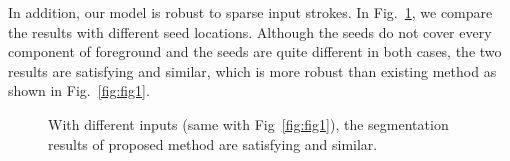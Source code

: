 \documentclass{article}
\begin{document}
In addition, our model is robust to sparse input strokes. In Fig.~\ref{fig:fig5}, we compare the results with different seed locations. Although the seeds do not cover every component of foreground and the seeds are quite different in both cases, the two results are satisfying and similar, which is more robust than existing method as shown in Fig.~\ref{fig:fig1}.
\begin{figure}[!htb]
\centering
   \caption{With different inputs (same with Fig~\ref{fig:fig1}), the segmentation results of proposed method are satisfying and similar.}
\label{fig:fig5}
\end{figure}
\end{document}
